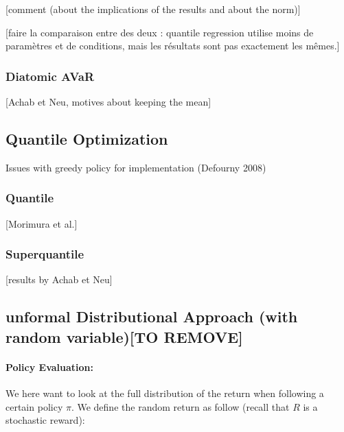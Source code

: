 [comment (about the implications of the results and about the norm)]


[faire la comparaison entre des deux : quantile regression utilise moins de paramètres et de conditions, mais les résultats sont pas exactement les mêmes.]

\subsubsection*{Diatomic AVaR}

[Achab et Neu, motives about keeping the mean]

\subsection{Quantile Optimization}


Issues with greedy policy for implementation (Defourny 2008)    


\subsubsection*{Quantile}

[Morimura et al.]

\subsubsection*{Superquantile}

[results by Achab et Neu]
























\newpage
\subsection{unformal Distributional Approach (with random variable)[TO REMOVE]}

\paragraph{Policy Evaluation:} 

We here want to look at the full distribution of the return when following a certain policy $\pi$. We define the random return as follow (recall that $R$ is a stochastic reward):

